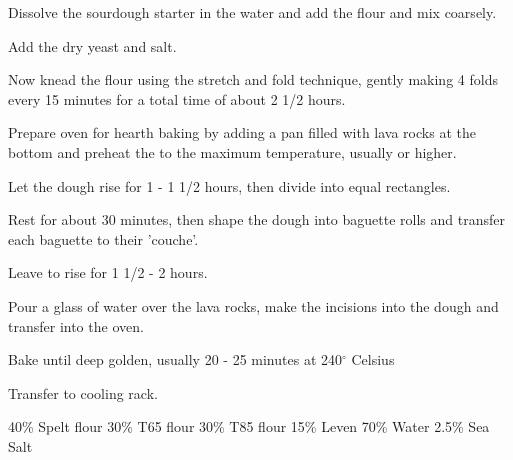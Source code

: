 \begin{method}
Dissolve the sourdough starter in the water and add the flour and mix coarsely.

Add the dry yeast and salt.

Now knead the flour using the stretch and fold technique, gently making 4 folds  every 15 minutes for a total time of about 2 1/2 hours.

Prepare oven for hearth baking by adding a pan filled with lava rocks at the bottom and preheat the to the maximum temperature, usually  or higher.

Let the dough rise for 1 - 1 1/2 hours, then divide into equal rectangles.

Rest for about 30 minutes, then shape the dough into baguette rolls and transfer each baguette to their 'couche'.

Leave to rise for 1 1/2 - 2 hours.

Pour a glass of water over the lava rocks, make the incisions into the dough and transfer into the oven.

Bake until deep golden,  usually 20 - 25 minutes at 240$^{\circ}$ Celsius

Transfer to cooling rack.

\end {method}

\label{rec:spelt-loaf}

\begin{ingreds}
	40\% Spelt flour
	30\% T65 flour
	30\% T85 flour
	15\% Leven
	70\% Water
	2.5\% Sea Salt

\end{ingreds}

